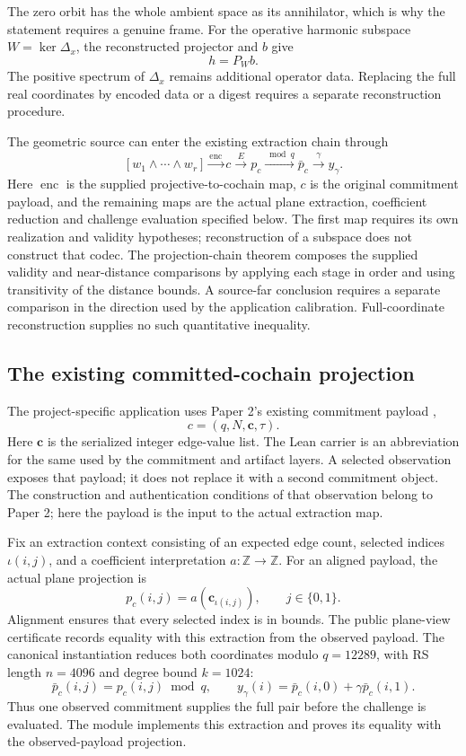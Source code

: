 The zero orbit has the whole ambient space as its annihilator, which is why
the statement requires a genuine frame. For the operative harmonic subspace
\(W=\ker\Delta_x\), the reconstructed projector and \(b\) give
\[
  h=P_Wb.
\]
The positive spectrum of \(\Delta_x\) remains additional operator data.
Replacing the full real coordinates by encoded data or a digest requires a
separate reconstruction procedure.

The geometric source can enter the existing extraction chain through
\[
  [w_1\wedge\cdots\wedge w_r]
  \xrightarrow{\operatorname{enc}} c
  \xrightarrow{E} p_c
  \xrightarrow{\bmod q} \bar p_c
  \xrightarrow{\gamma} y_\gamma.
\]
Here \(\operatorname{enc}\) is the supplied projective-to-cochain map,
\(c\) is the original commitment payload, and the remaining maps are the
actual plane extraction, coefficient reduction and challenge evaluation
specified below. The first map requires its own realization and validity
hypotheses; reconstruction of a subspace does not construct that codec.
The projection-chain theorem composes the supplied validity and near-distance
comparisons by applying each stage in order and using transitivity of the
distance bounds. A source-far conclusion requires a separate comparison in
the direction used by the application calibration. Full-coordinate
reconstruction supplies no such quantitative inequality.

\subsection{The existing committed-cochain projection}

The project-specific application uses Paper 2's existing commitment payload
\cite{vanDerVlugt2026protocol},
\[
  c=(q,N,\mathbf c,\tau).
\]
Here \(\mathbf c\) is the serialized integer edge-value list. The Lean
carrier  is an abbreviation for the same
 used by the commitment and artifact
layers. A selected observation exposes that payload; it does not replace it
with a second commitment object. The construction and authentication
conditions of that observation belong to Paper 2; here the payload is the
input to the actual extraction map.

Fix an extraction context consisting of an expected edge count, selected
indices \(\iota(i,j)\), and a coefficient interpretation
\(a:\mathbb Z\to\mathbb Z\). For an aligned payload, the actual plane
projection is
\[
  p_c(i,j)=a(\mathbf c_{\iota(i,j)}),
  \qquad j\in\{0,1\}.
\]
Alignment ensures that every selected index is in bounds. The public
plane-view certificate records equality with this extraction from the
observed payload. The canonical instantiation reduces both coordinates
modulo \(q=12289\), with RS length \(n=4096\) and degree bound \(k=1024\):
\[
  \bar p_c(i,j)=p_c(i,j)\bmod q,
  \qquad
  y_\gamma(i)=\bar p_c(i,0)+\gamma\bar p_c(i,1).
\]
Thus one observed commitment supplies the full pair before the challenge is
evaluated. The  module implements this extraction
and proves its equality with the observed-payload projection.

